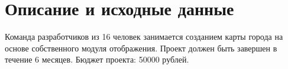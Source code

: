 \section{Описание и исходные данные}
Команда разработчиков из 16 человек занимается созданием карты города на основе собственного модуля отображения. 
Проект должен быть завершен в течение 6 месяцев. 
Бюджет проекта: 50000 рублей.








